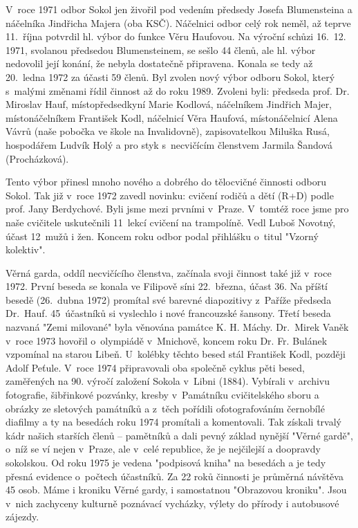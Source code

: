 \documentclass[a5paper, 11pt, twoside]{article}
\begin{document}
V~roce 1971 odbor Sokol jen živořil pod vedením předsedy Josefa
Blumensteina a náčelníka Jindřicha Majera (oba KSČ). Náčelnici odbor
celý rok neměl, až teprve 11.~října potvrdil hl. výbor do funkce Věru
Haufovou. Na výroční schůzi 16.~12. 1971, svolanou předsedou
Blumensteinem, se sešlo 44 členů, ale hl. výbor nedovolil její konání,
že nebyla dostatečně připravena. Konala se tedy až 20.~ledna 1972 za
účasti 59 členů. Byl zvolen nový výbor odboru Sokol, který s~malými
změnami řídil činnost až do roku 1989. Zvoleni byli: předseda prof. Dr.
Miroslav Hauf, místopředsedkyní Marie Kodlová, náčelníkem Jindřich
Majer, místonáčelníkem František Kodl, náčelnicí Věra Haufová,
místonáčelnicí Alena Vávrů (naše pobočka ve škole na Invalidovně),
zapisovatelkou Miluška Rusá, hospodářem Ludvík Holý a pro styk
s~necvičícím členstvem Jarmila Šandová (Procházková).

Tento výbor přinesl mnoho nového a dobrého do tělocvičné činnosti odboru
Sokol. Tak již v~roce 1972 zavedl novinku: cvičení rodičů a dětí (R+D)
podle prof. Jany Berdychové. Byli jsme mezi prvními v~Praze. V~tomtéž
roce jsme pro naše cvičitele uskutečnili 11~lekcí cvičení na trampolíně.
Vedl Luboš Novotný, účast 12~mužů i žen. Koncem roku odbor podal
přihlášku o~titul "Vzorný kolektiv".

Věrná garda, oddíl necvičícího členstva, začínala svoji činnost také již
v~roce 1972. První beseda se konala ve Filipově síni 22.~března, účast
36. Na příští besedě (26.~dubna 1972) promítal své barevné diapozitivy
z~Paříže předseda Dr.~Hauf. 45~účastníků si vyslechlo i nové francouzské
šansony. Třetí beseda nazvaná "Zemi milované" byla věnována památce K.
H. Máchy. Dr.~Mirek Vaněk v~roce 1973 hovořil o~olympiádě v~Mnichově,
koncem roku Dr. Fr. Bulánek vzpomínal na starou Libeň. U~kolébky těchto
besed stál František Kodl, později Adolf Peťule. V~roce 1974
připravovali oba společně cyklus pěti besed, zaměřených na 90. výročí
založení Sokola v~Libni (1884). Vybírali v~archivu fotografie,
šibřinkové pozvánky, kresby v~Památníku cvičitelského sboru a obrázky ze
sletových památníků a z~těch pořídili ofotografováním černobílé diafilmy
a ty na besedách roku 1974 promítali a komentovali. Tak získali trvalý
kádr našich starších členů -- pamětníků a dali pevný základ nynější
"Věrné gardě", o~níž se ví nejen v~Praze, ale v~celé republice, že je
nejčilejší a doopravdy sokolskou. Od roku 1975 je vedena "podpisová
kniha" na besedách a je tedy přesná evidence o~počtech účastníků. Za 22
roků činnosti je průměrná návštěva 45 osob. Máme i kroniku Věrné gardy,
i samostatnou "Obrazovou kroniku". Jsou v~nich zachyceny kulturně
poznávací vycházky, výlety do přírody i autobusové zájezdy.
\end{document}
